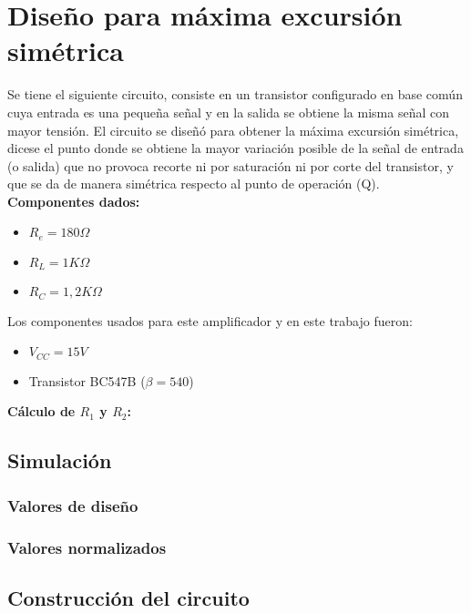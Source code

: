 \section{Diseño para máxima excursión simétrica}

\begin{multicols}{2}
    \sangria{} Se tiene el siguiente circuito, consiste en un transistor configurado en base común cuya entrada es una pequeña señal y en la salida se obtiene la misma señal con mayor tensión.
    \sangria{} El circuito se diseñó para obtener la máxima excursión simétrica, dicese el punto donde se obtiene la mayor variación posible de la señal de entrada (o salida) que no provoca recorte ni por saturación ni por corte del transistor, y que se da de manera simétrica respecto al punto de operación (Q). \\[5pt]
    \textbf{Componentes dados:}
    \begin{itemize}[nosep]
        \item $R_e = 180\Omega$
        \item $R_L = 1 K\Omega$
        \item $R_C = 1,2 K\Omega$
    \end{itemize}
    \columnbreak
\end{multicols}


\begin{multicols}{2}
    \sangria{} Los componentes usados para este amplificador y en este trabajo fueron:
    \begin{itemize}[nosep]
        \item $V_{CC} = 15V$
        \item Transistor BC547B ($\beta = 540$)
    \end{itemize}
    \textbf{Cálculo de $R_1$ y $R_2$:}\\[4pt]
\end{multicols}

\subsection{Simulación}

\subsubsection{Valores de diseño}
\subsubsection{Valores normalizados}

\subsection{Construcción del circuito}
